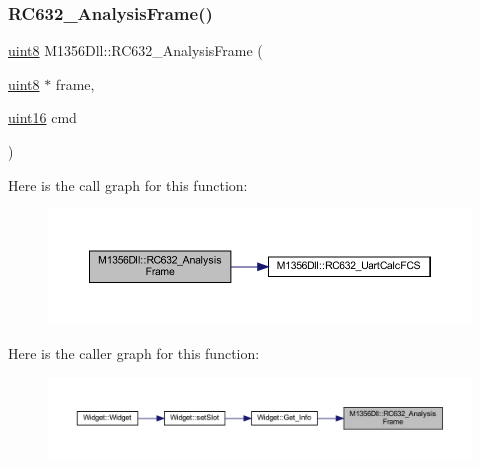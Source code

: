 \mbox{\label{class_m1356_dll_a40aed3801baa294bf828c5ab794ef82e}} 
\subsubsection{\texorpdfstring{RC632\_AnalysisFrame()}{RC632\_AnalysisFrame()}\hspace{0.1cm}{\footnotesize\ttfamily [2/2]}}
{\footnotesize\ttfamily \mbox{\hyperlink{inc_2m1356dll_8h_adde6aaee8457bee49c2a92621fe22b79}{uint8}} M1356\+Dll\+::\+R\+C632\+\_\+\+Analysis\+Frame (\begin{DoxyParamCaption}\item[{\mbox{\hyperlink{inc_2m1356dll_8h_adde6aaee8457bee49c2a92621fe22b79}{uint8}} $\ast$}]{frame,  }\item[{\mbox{\hyperlink{inc_2m1356dll_8h_a05f6b0ae8f6a6e135b0e290c25fe0e4e}{uint16}}}]{cmd }\end{DoxyParamCaption})}

Here is the call graph for this function\+:
\nopagebreak
\begin{figure}[H]
\begin{center}
\leavevmode
\includegraphics[width=350pt]{class_m1356_dll_a40aed3801baa294bf828c5ab794ef82e_cgraph}
\end{center}
\end{figure}
Here is the caller graph for this function\+:
\nopagebreak
\begin{figure}[H]
\begin{center}
\leavevmode
\includegraphics[width=350pt]{class_m1356_dll_a40aed3801baa294bf828c5ab794ef82e_icgraph}
\end{center}
\end{figure}
\mbox{\label{class_m1356_dll_ab86ae59233d587f4688470796cbb85b1}} 
